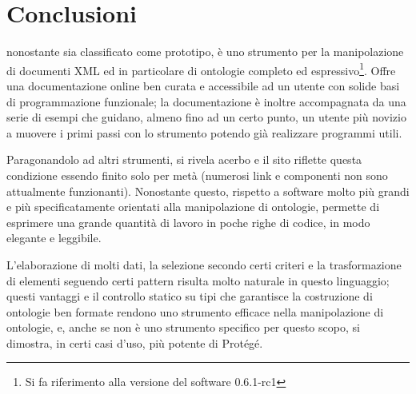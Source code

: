 \section{Conclusioni}
\cduce nonostante sia classificato come prototipo, è uno strumento per la manipolazione di documenti XML ed in particolare di ontologie completo ed espressivo\footnote{Si fa riferimento alla versione del software 0.6.1-rc1}. Offre una documentazione online ben curata e accessibile ad un utente con solide basi di programmazione funzionale; la documentazione è inoltre accompagnata da una serie di esempi che guidano, almeno fino ad un certo punto, un utente più novizio a muovere i primi passi con lo strumento potendo già realizzare programmi utili.

Paragonandolo ad altri strumenti, si rivela acerbo e il sito riflette questa condizione essendo finito solo per metà (numerosi link e componenti non sono attualmente funzionanti). Nonostante questo, rispetto a software molto più grandi e più specificatamente orientati alla manipolazione di ontologie, \cduce permette di esprimere una grande quantità di lavoro in poche righe di codice, in modo elegante e leggibile. 

L'elaborazione di molti dati, la selezione secondo certi criteri e la trasformazione di elementi seguendo certi pattern risulta molto naturale in questo linguaggio; questi vantaggi e il controllo statico su tipi che garantisce la costruzione di ontologie ben formate rendono \cduce uno strumento efficace nella manipolazione di ontologie, e, anche se non è uno strumento specifico per questo scopo, si dimostra, in certi casi d'uso, più potente di Protégé. 